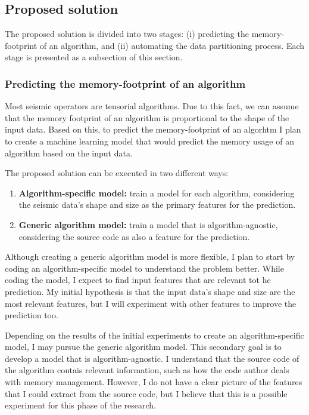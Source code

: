 \subsection{Proposed solution}
\label{subsec:proposed-solution}

The proposed solution is divided into two stages:
(i) predicting the memory-footprint of an algorithm, and
(ii) automating the data partitioning process.
Each stage is presented as a subsection of this section.

\subsubsection{Predicting the memory-footprint of an algorithm}

Most seismic operators are tensorial algorithms.
Due to this fact, we can assume that the memory footprint of an algorithm is proportional to the shape of the input data.
Based on this, to predict the memory-footprint of an algorhtm I plan to create a machine learning model that would predict the memory usage of an algorithm based on the input data. 

The proposed solution can be executed in two different ways:

\begin{enumerate}
  \item \textbf{Algorithm-specific model:} train a model for each algorithm, considering the seismic data's shape and size as the primary features for the prediction.
  \item \textbf{Generic algorithm model:} train a model that is algorithm-agnostic, considering the source code as also a feature for the prediction.
\end{enumerate}

Although creating a generic algorithm model is more flexible, I plan to start by coding an algorithm-specific model to understand the problem better.
While coding the model, I expect to find input features that are relevant tot he prediction.
My initial hypothesis is that the input data's shape and size are the most relevant features, but I will experiment with other features to improve the prediction too.

Depending on the results of the initial experiments to create an algorithm-specific model, I may pursue the generic algorithm model.
This secondary goal is to develop a model that is algorithm-agnostic.
I understand that the source code of the algorithm contais relevant information, such as how the code author deals with memory management.
However, I do not have a clear picture of the features that I could extract from the source code, but I believe that this is a possible experiment for this phase of the research.


